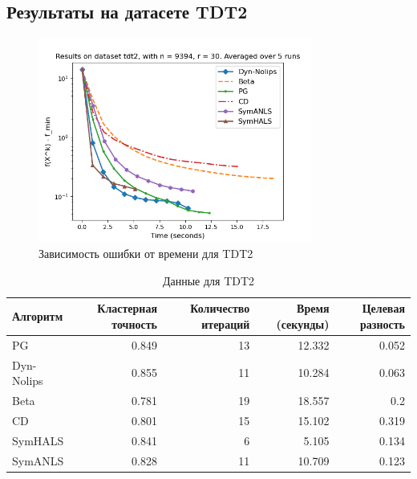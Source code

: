 \documentclass[a4paper,11pt]{article}
\begin{document}
\subsection{Результаты на датасете TDT2}
\begin{figure}[h!]
    \centering \includegraphics[width=0.8\textwidth]{my_plot_tdt2.png}
    \caption{Зависимость ошибки от времени для TDT2}
    \label{fig:tdt2}
\end{figure}
\begin{table}[h!]
    \centering
    \caption{Данные для TDT2}
    \label{tab:clustering_accuracy_tdt2}
    \begin{tabular}{|l|r|r|r|r|}
        \hline
        Алгоритм & Кластерная точность & Количество итераций & Время (секунды) & Целевая разность \\
        \hline
        PG & 0.849 & 13 & 12.332 & 0.052 \\
        Dyn-Nolips & 0.855 & 11 & 10.284 & 0.063 \\
        Beta & 0.781 & 19 & 18.557 & 0.2 \\
        CD & 0.801 & 15 & 15.102 & 0.319 \\
        SymHALS & 0.841 & 6 & 5.105 & 0.134 \\
        SymANLS & 0.828 & 11 & 10.709 & 0.123 \\
        \hline
    \end{tabular}
\end{table}
\newpage
\end{document}
